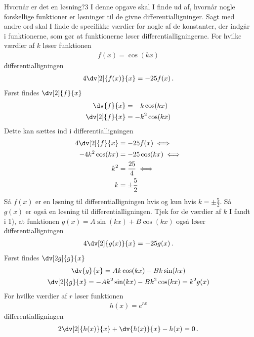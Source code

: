 \begin{opgave}{Hvornår er det en løsning?}{3}
	I denne opgave skal I finde ud af, hvornår nogle forskellige funktioner er løsninger til de givne differentialligninger. Sagt med andre ord skal I finde de specifikke værdier for nogle af de konstanter, der indgår i funktionerne, som gør at funktionerne løser differentialligningerne.
	\opg For hvilke værdier af $k$ løser funktionen
	\begin{align*}
	f(x) = \cos (kx)
	\end{align*}
	differentialligningen
	\begin{align*}
	4 \dv[2]{f(x)}{x} = - 25f(x) \, .
	\end{align*}
	Først findes $\dv[2]{f}{x}$
	\begin{align*}
	\dv{f}{x}&=-k\cos(kx)\\
	\dv[2]{f}{x}&=-k^2\cos(kx)
	\end{align*}
	Dette kan sættes ind i differentialligningen
	\begin{align*}
	    4\dv[2]{f}{x}&=-25f(x)\iff\\
	    -4k^2\cos(kx)&=-25\cos(kx)\iff\\
	    k^2&=\frac{25}{4}\iff\\
	    k&=\pm \frac{5}{2}
	\end{align*}
	Så $f(x)$ er en løsning til differentialligningen hvis og kun hvis $k=\pm\frac{5}{2}$.
		Så $g(x)$ er også en løsning til differentialligningen.
	\opg Tjek for de værdier af $k$ I fandt i 1), at funktionen $g(x) = A \sin (kx) + B \cos (kx)$ også løser differentialligningen
	\begin{align*}
	4 \dv[2]{g(x)}{x} = -25 g(x) \, .
	\end{align*}
	Først findes $\dv[2g]{g}{x}$
	\begin{gather*}
	    \dv{g}{x}=Ak\cos(kx)-Bk\sin(kx)\\
	    \dv[2]{g}{x}=-Ak^2\sin(kx)-Bk^2\cos(kx)=k^2g(x)
	\end{gather*}
	\opg For hvilke værdier af $r$ løser funktionen
	\begin{align*}
	h(x) = e^{rx}
	\end{align*}
	differentialligningen
	\begin{align*}
	2 \dv[2]{h(x)}{x} + \dv{h(x)}{x} - h(x) = 0 \, .
	\end{align*}
	

\end{opgave}
